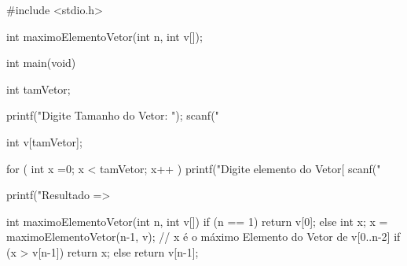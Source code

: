 #include <stdio.h>

int maximoElementoVetor(int n, int v[]);

int main(void){
  int tamVetor;
  
  printf("Digite Tamanho do Vetor: "); 
  scanf("%

  int v[tamVetor];
  
  for ( int x =0; x < tamVetor; x++ ){
     printf("Digite elemento do Vetor[%
	 scanf("%
  }
     
   printf("Resultado => %
}

int maximoElementoVetor(int n, int v[])
{ 
   if (n == 1)
      return v[0];
   else {
      int x;
      x = maximoElementoVetor(n-1, v);
      // x é o máximo Elemento do Vetor de v[0..n-2] 
      if (x > v[n-1]) return x;
      else return v[n-1]; 
   }
}